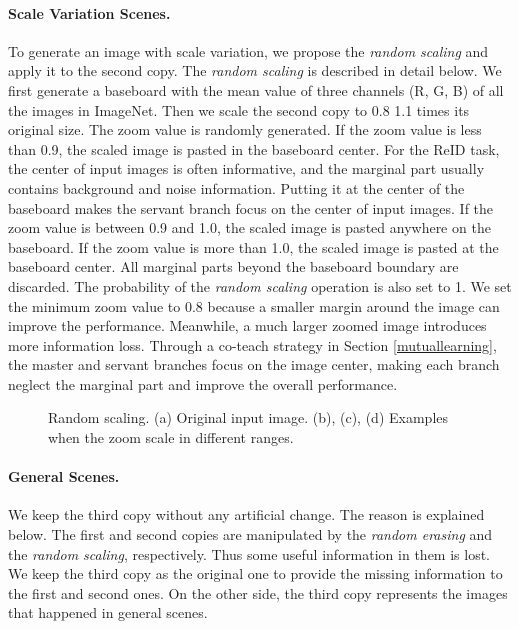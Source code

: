 \documentclass[a4paper]{cas-dc}
\begin{document}
\paragraph{Scale Variation Scenes.} To generate an image with scale variation, we propose the \textit{random scaling} and apply it to the second copy. The \textit{random scaling} is described in detail below. We first generate a baseboard with the mean value of three channels (R, G, B) of all the images in ImageNet. Then we scale the second copy to 0.8  1.1 times its original size. The zoom value is randomly generated. If the zoom value is less than 0.9, the scaled image is pasted in the baseboard center. For the ReID task, the center of input images is often informative, and the marginal part usually contains background and noise information. Putting it at the center of the baseboard makes the servant branch focus on the center of input images. If the zoom value is between 0.9 and 1.0, the scaled image is pasted anywhere on the baseboard. If the zoom value is more than 1.0, the scaled image is pasted at the baseboard center. All marginal parts beyond the baseboard boundary are discarded. The probability of the \textit{random scaling} operation is also set to 1. We set the minimum zoom value to 0.8 because a smaller margin around the image can improve the performance. Meanwhile, a much larger zoomed image introduces more information loss. Through a co-teach strategy in Section \ref{mutuallearning}, the master and servant branches focus on the image center, making each branch neglect the marginal part and improve the overall performance.

\begin{figure}[!h]
	\centering 
	\caption{Random scaling. (a) Original input image. (b), (c), (d) Examples when the zoom scale in different ranges.} \label{randomscale}
\end{figure}

\paragraph{General Scenes.} We keep the third copy without any artificial change. The reason is explained below. The first and second copies are manipulated by the \textit{random erasing} and the \textit{random scaling}, respectively. Thus some useful information in them is lost. We keep the third copy as the original one to provide the missing information to the first and second ones. On the other side, the third copy represents the images that happened in general scenes.
\end{document}

